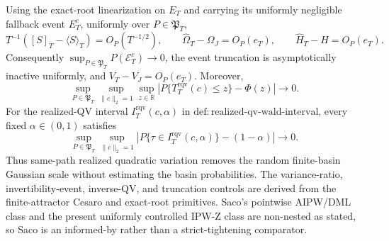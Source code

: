 Using the exact-root linearization on \(E_T\) and carrying its uniformly negligible fallback event \(E_T^c\), uniformly over \(P\in\mathfrak P_T\),
\[
 T^{-1}([S]_T-\langle S\rangle_T)=O_P(T^{-1/2}),\qquad
 \widehat\Omega_T-\Omega_J=O_P(e_T),\qquad
 \widehat H_T-H=O_P(e_T).
\]
Consequently \(\sup_{P\in\mathfrak P_T}P(\mathcal E_T^c)\to0\), the event truncation is asymptotically inactive uniformly, and \(\widehat V_T-V_J=O_P(e_T)\). Moreover,
\[
 \sup_{P\in\mathfrak P_T}\sup_{\|c\|_2=1}\sup_{z\in\mathbb R}
 \left|P\{T_T^{\mathrm{rqv}}(c)\le z\}-\Phi(z)\right|\longrightarrow0.
\]
For the realized-QV interval \(I_T^{\mathrm{rqv}}(c,\alpha)\) in \(\mathrm{def:realized\text{-}qv\text{-}wald\text{-}interval}\), every fixed \(\alpha\in(0,1)\) satisfies
\[
 \sup_{P\in\mathfrak P_T}\sup_{\|c\|_2=1}
 \left|P\{\tau\in I_T^{\mathrm{rqv}}(c,\alpha)\}-(1-\alpha)\right|\longrightarrow0.
\]
Thus same-path realized quadratic variation removes the random finite-basin Gaussian scale without estimating the basin probabilities. The variance-ratio, invertibility-event, inverse-QV, and truncation controls are derived from the finite-attractor Cesaro and exact-root primitives. Saco's pointwise AIPW/DML class and the present uniformly controlled IPW-Z class are non-nested as stated, so Saco is an informed-by rather than a strict-tightening comparator.